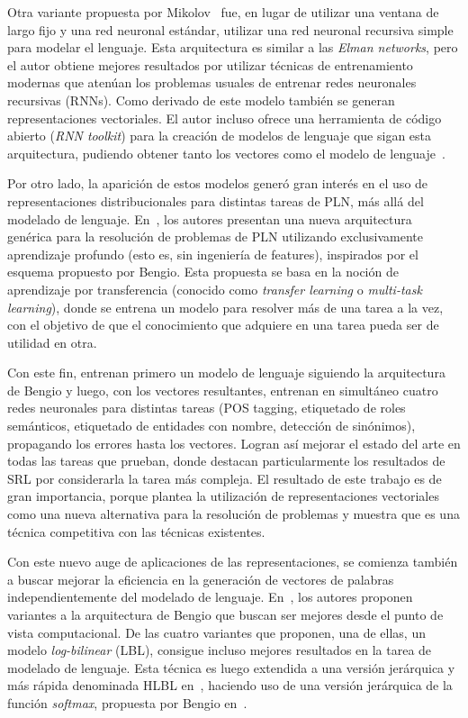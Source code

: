 Otra variante propuesta por Mikolov~\cite{Mikolov2010, Mikolov2011a, Mikolov2011b, Mikolov2011c}
fue, en lugar de utilizar una ventana de largo fijo y una red neuronal estándar, utilizar una red
neuronal recursiva simple para modelar el lenguaje. Esta arquitectura es similar a las \textit{Elman
networks}, pero el autor obtiene mejores resultados por utilizar técnicas de entrenamiento modernas
que atenúan los problemas usuales de entrenar redes neuronales recursivas (RNNs). Como derivado de
este modelo también se generan representaciones vectoriales. El autor incluso ofrece una herramienta
de código abierto (\textit{RNN toolkit}) para la creación de modelos de lenguaje que sigan esta
arquitectura, pudiendo obtener tanto los vectores como el modelo de lenguaje~\cite{Mikolov2011c}.


Por otro lado, la aparición de estos modelos generó gran interés en el uso de representaciones
distribucionales para distintas tareas de PLN, más allá del modelado de
lenguaje. En~\cite{CollobertWeston2008}, los autores presentan una nueva arquitectura genérica para
la resolución de problemas de PLN utilizando exclusivamente aprendizaje profundo (esto es, sin
ingeniería de features), inspirados por el esquema propuesto por Bengio. Esta propuesta se basa en
la noción de aprendizaje por transferencia (conocido como \textit{transfer learning} o
\textit{multi-task learning}), donde se entrena un modelo para resolver más de una tarea a la vez,
con el objetivo de que el conocimiento que adquiere en una tarea pueda ser de utilidad en otra.

Con este fin, entrenan primero un modelo de lenguaje siguiendo la arquitectura de Bengio y luego,
con los vectores resultantes, entrenan en simultáneo cuatro redes neuronales para distintas tareas
(POS tagging, etiquetado de roles semánticos, etiquetado de entidades con nombre, detección de
sinónimos), propagando los errores hasta los vectores. Logran así mejorar el estado del arte en
todas las tareas que prueban, donde destacan particularmente los resultados de SRL por considerarla
la tarea más compleja. El resultado de este trabajo es de gran importancia, porque plantea la
utilización de representaciones vectoriales como una nueva alternativa para la resolución de
problemas y muestra que es una técnica competitiva con las técnicas existentes.


Con este nuevo auge de aplicaciones de las representaciones, se comienza también a buscar mejorar
la eficiencia en la generación de vectores de palabras independientemente del modelado de
lenguaje. En~\cite{MnihHinton2007}, los autores proponen variantes a la arquitectura de Bengio que
buscan ser mejores desde el punto de vista computacional. De las cuatro variantes que proponen, una
de ellas, un modelo \textit{log-bilinear} (LBL), consigue incluso mejores resultados en la tarea de
modelado de lenguaje. Esta técnica es luego extendida a una versión jerárquica y más rápida
denominada HLBL en~\cite{MnihHinton2009}, haciendo uso de una versión jerárquica de la función
\textit{softmax}, propuesta por Bengio en~\cite{MorinBengio2005}.


